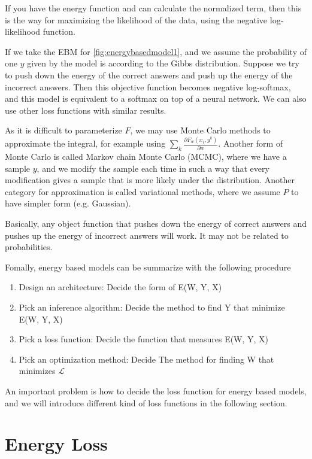 If you have the energy function and can calculate the normalized term, then this is the way for maximizing the likelihood of the data, using the negative log-likelihood function.

If we take the EBM for \cref{fig:energybasedmodel1}, and we assume the probability of one $y$ given by the model is according to the Gibbs distribution. 
Suppose we try to push down the energy of the correct answers and push up the energy of the incorrect answers. 
Then this objective function becomes negative log-softmax, and this model is equivalent to a softmax on top of a neural network. 
We can also use other loss functions with similar results.

As it is difficult to parameterize $F$, we may use Monte Carlo methods to approximate the integral, for example using $\sum_{k} \frac{\partial F_w(x_i,y^k)}{\partial w}$. Another form of Monte Carlo is called Markov chain Monte Carlo (MCMC), where we have a sample $y$, and we modify the sample each time in such a way that every modification gives a sample that is more likely under the distribution. Another category for approximation is called variational methods, where we assume $P$ to have simpler form (e.g. Gaussian).

Basically, any object function that pushes down the energy of correct answers and pushes up the energy of incorrect answers will work. It may not be related to probabilities.

Fomally, energy based models can be summarize with the following procedure
\begin{enumerate}
    \item Design an architecture: Decide the form of E(W, Y, X)
    \item Pick an inference algorithm: Decide the method to find Y that minimize E(W, Y, X)
    \item Pick a loss function: Decide the function that measures E(W, Y, X)
    \item Pick an optimization method: Decide The method for finding W that minimizes $\mathcal{L}$
\end{enumerate} 

An important problem is how to decide the loss function for energy based models, and we will introduce different kind of loss functions in the following section.

\section{Energy Loss}


